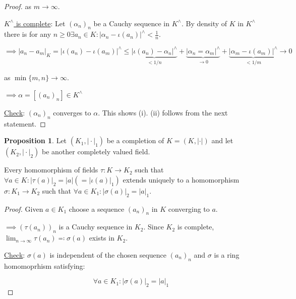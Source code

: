 \documentclass[openany]{amsbook}
\numberwithin{section}{chapter}
\theoremstyle{definition}
\newtheorem{proposition}[theorem]{Proposition}
\begin{document}
\begin{proof}
    as \(m\to \infty\).

    \underline{\(K^\wedge\) is complete}: Let \((\alpha_n)_n\) be a Cauchy sequence in \(K^\wedge\). By density of \(K\) in \(K^\wedge\) there is for any \(n \geq 0 \exists a_n \in K : \vert \alpha_n - \iota(a_n) \vert ^\wedge < \frac{1}{n}\).
    
    \[
        \implies \vert a_n - a_m \vert_K = \vert \iota(a_n) - \iota(a_m) \vert ^\wedge \leq \underbrace{\vert \iota (a_n) - \alpha_n \vert^\wedge}_{< 1 / n} + \underbrace{\vert \alpha_n = \alpha_m \vert ^\wedge}_{\to 0} + \underbrace{\vert \alpha_m - \iota(a_m) \vert^\wedge}_{< 1 / m} \to 0
    \]

    as \(\min\{ m,n \} \to \infty\).

    \(\implies \alpha = [(a_n)_n]\in K^\wedge\)


    \underline{Check}: \((\alpha_n)_n\) converges to \(\alpha\). This shows (i). (ii) follows from the next statement.

\end{proof}

\begin{proposition}
    Let \((K_1, \vert \cdot \vert_1)\) be a completion of \(K = (K, \vert \cdot \vert)\) and let \((K_2, \vert \cdot \vert_2)\) be another completely valued field.

    Every homomorphism of fields \(\tau : K \to K_2\) such that \(\forall a\in K: \vert \tau (a) \vert _2 = \vert a \vert (= \vert \iota (a) \vert _1)\) extends uniquely to a homomorphism \(\sigma : K_1 \to K_2\) such that \(\forall a\in K_1: \vert \sigma (a) \vert _2 = \vert a \vert _1\).
\end{proposition}

\begin{proof}
    Given \(a\in K_1\) choose a sequence \((a_n)_n\) in \(K\) converging to \(a\).

    \(\implies (\tau(a_n))_n\) is a Cauchy sequence in \(K_2\). Since \(K_2\) is complete, \(\lim_{n \to \infty} \tau(a_n) \eqqcolon \sigma(a)\) exists in \(K_2\).
    
    \underline{Check}: \(\sigma(a)\) is independent of the chosen sequence \((a_n)_n\) and \(\sigma\) is a ring homomoprhism satisfying:

    \[
        \forall a\in K_1: \vert \sigma(a) \vert _2 = \vert a \vert_1
    \]
\end{proof}
\end{document}
